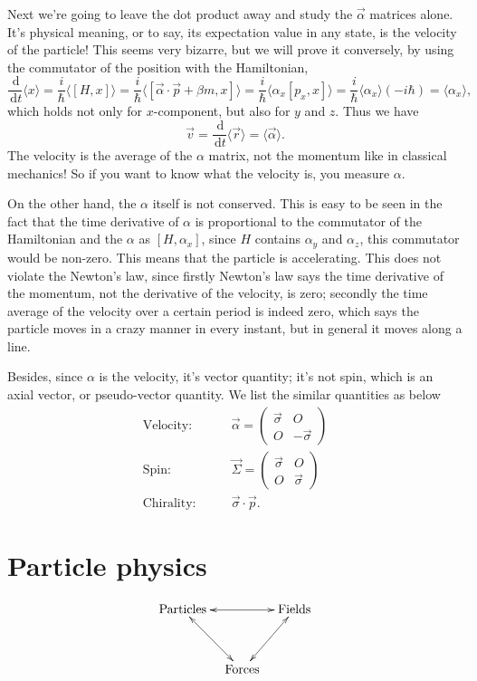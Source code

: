 \documentclass{article}
\newcommand{\be}{\begin{equation}}
\newcommand{\ee}{\end{equation}}
\newcommand{\ba}{\begin{array}}
\newcommand{\ea}{\end{array}}
\newcommand{\dif}{\,\mathrm{d}}
\renewcommand{\1}{\left}
\renewcommand{\2}{\right}
\newcommand{\la}{\langle}
\newcommand{\ra}{\rangle}
\newcommand{\al}{\alpha}
\newcommand{\bet}{\beta}
\newcommand{\sig}{\sigma}
\begin{document}
Next we're going to leave the dot product away and study the $\vec\al$ matrices alone. It's physical meaning, or to say, its expectation value in any state, is the velocity of the particle! This seems very bizarre, but we will prove it conversely, by using the commutator of the position with the Hamiltonian,
\be
\frac{\dif}{\dif t}{\la x\ra}=\frac i \hbar \la[H,x]\ra=\frac i \hbar\la[\vec\al\cdot\vec p+\bet m, x]\ra=\frac i \hbar \la\al_x[p_x,x]\ra=\frac i \hbar \la\al_x\ra (-i\hbar)=\la\al_x\ra,
\ee
which holds not only for $x$-component, but also for $y$ and $z$. Thus we have
\be
\vec v=\frac{\dif}{\dif t}{\la \vec r\ra}=\la\vec\al\ra.
\ee
The velocity is the average of the $\al$ matrix, not the momentum like in classical mechanics! So if you want to know what the velocity is, you measure $\al$.

On the other hand, the $\al$ itself is not conserved. This is easy to be seen in the fact that the time derivative of $\al$ is proportional to the commutator of the Hamiltonian and the $\al$ as $[H,\al_x]$, since $H$ contains $\al_y$ and $\al_z$, this commutator would be non-zero. This means that the particle is accelerating. This does not violate the Newton's law, since firstly Newton's law says the time derivative of the momentum, not the derivative of the velocity, is zero; secondly the time average of the velocity over a certain period is indeed zero, which says the particle moves in a crazy manner in every instant, but in general it moves along a line.

Besides, since $\al$ is the velocity, it's vector quantity; it's not spin, which is an axial vector, or pseudo-vector quantity. We list the similar quantities as below
\be\begin{split}
\text{Velocity:}&\quad\quad \vec\al=\1(\ba{cc}\vec\sig&O\\O&-\vec\sig\ea\2)\\
\text{Spin:}&\quad\quad \vec\Sigma=\1(\ba{cc}\vec\sig&O\\O&\vec\sig\ea\2)\\
\text{Chirality:}&\quad\quad \vec\sig\cdot\vec p.
\end{split}\ee

\newpage
\section{Particle physics}
\be
\begin{gathered} \xymatrix@R=8ex@C=2ex{
\text{Particles} \ar@{<->}[rd] \ar@{<->}[rr]& &\text{Fields} \ar@{<->}[ld] \\
&\text{Forces}& \\
} \end{gathered}
\ee
\end{document}
